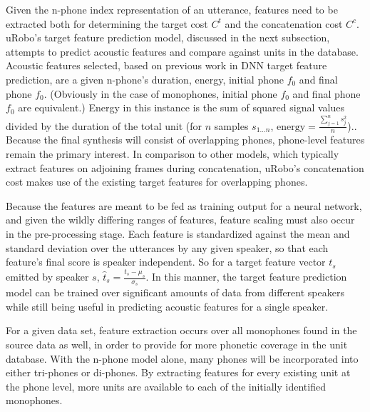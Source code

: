 \documentclass[10pt, journal, compsoc]{IEEEtran}
\begin{document}
Given the n-phone index representation of an utterance, features need to be extracted both for determining the target cost $C^t$ and the concatenation cost $C^c$. uRobo's target feature prediction model, discussed in the next subsection, attempts to predict acoustic features and compare against units in the database. Acoustic features selected, based on previous work in DNN target feature prediction, are a given n-phone's duration, energy, initial phone $f_0$ and final phone $f_0$. (Obviously in the case of monophones, initial phone $f_0$ and final phone $f_0$ are equivalent.) Energy in this instance is the sum of squared signal values divided by the duration of the total unit (for $n$ samples $s_{1...n}$, $\textrm{energy}=\frac{\sum_{j=1}^n s_j^2}{n}$).\cite{Jurafsky:2009:SLP:1214993}. Because the final synthesis will consist of overlapping phones, phone-level features remain the primary interest. In comparison to other models, which typically extract features on adjoining frames during concatenation\cite{a102c4924c19470ab180d278d2029de5}, uRobo's concatenation cost makes use of the existing target features for overlapping phones.\par
Because the features are meant to be fed as training output for a neural network, and given the wildly differing ranges of features, feature scaling must also occur in the pre-processing stage. Each feature is standardized against the mean and standard deviation over the utterances by any given speaker, so that each feature's final score is speaker independent. So for a target feature vector $t_{s}$ emitted by speaker $s$, $\hat{t}_s=\frac{t_s-\mu_s}{\sigma_s}$\cite{Beigi:2011:FSR:2124400}. In this manner, the target feature prediction model can be trained over significant amounts of data from different speakers while still being useful in predicting acoustic features for a single speaker.\par
For a given data set, feature extraction occurs over all monophones found in the source data as well, in order to provide for more phonetic coverage in the unit database. With the n-phone model alone, many phones will be incorporated into either tri-phones or di-phones. By extracting features for every existing unit at the phone level, more units are available to each of the initially identified monophones.
\end{document}

